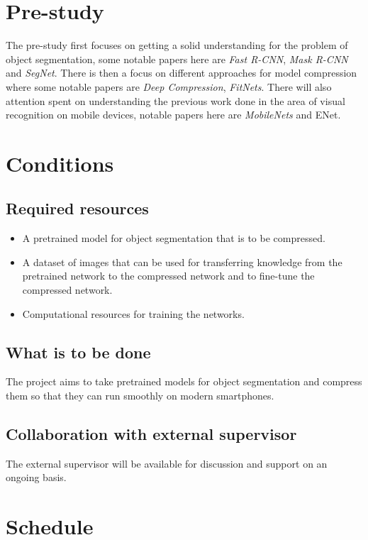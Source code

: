 \documentclass[11pt]{article}
\newcommand{\bibentry}[1]{\cite{#1}}
\begin{document}
\section{Pre-study}
\label{sec:org674adec}
The pre-study first focuses on getting a solid understanding for the problem of object segmentation, some notable papers here are \emph{Fast R-CNN}\bibentry{girshick2015fast}, \emph{Mask R-CNN}\bibentry{he2017mask} and \emph{SegNet}\bibentry{badrinarayanan2015segnet}.
There is then a focus on different approaches for model compression where some notable papers are \emph{Deep Compression}\bibentry{han2015deep}, \emph{FitNets}\bibentry{romero2014fitnets}.
There will also attention spent on understanding the previous work done in the area of visual recognition on mobile devices, notable papers here are \emph{MobileNets}\bibentry{howard2017mobilenets} and ENet\bibentry{paszke2016enet}. 

\section{Conditions}
\label{sec:org1cecf22}
\subsection{Required resources}
\label{sec:org3a74ed1}
\begin{itemize}
\item A pretrained model for object segmentation that is to be compressed.
\item A dataset of images that can be used for transferring knowledge from the pretrained network to the compressed network and to fine-tune the compressed network.
\item Computational resources for training the networks.
\end{itemize}
\subsection{What is to be done}
\label{sec:org604aa4c}
The project aims to take pretrained models for object segmentation and compress them so that they can run smoothly on modern smartphones.
\subsection{Collaboration with external supervisor}
\label{sec:orgbbaf2b0}
The external supervisor will be available for discussion and support on an ongoing basis.
\section{Schedule}
\label{sec:org0ce95d9}
\end{document}
